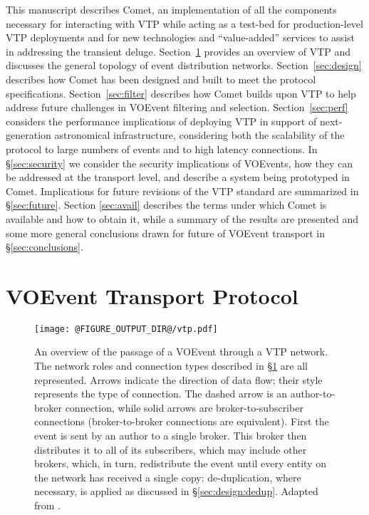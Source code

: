 \documentclass[5p,authoryear]{elsarticle}
\begin{document}
This manuscript describes Comet, an implementation of all the components
necessary for interacting with VTP while acting as a test-bed for
production-level VTP deployments and for new technologies and ``value-added''
services to assist in addressing the transient deluge. Section~\ref{sec:vtp}
provides an overview of VTP and discusses the general topology of event
distribution networks. Section~\ref{sec:design} describes how Comet has been
designed and built to meet the protocol specifications.
Section~\ref{sec:filter} describes how Comet builds upon VTP to help address
future challenges in VOEvent filtering and selection. Section~\ref{sec:perf}
considers the performance implications of deploying VTP in support of
next-generation astronomical infrastructure, considering both the scalability
of the protocol to large numbers of events and to high latency connections. In
\S\ref{sec:security} we consider the security implications of VOEvents, how
they can be addressed at the transport level, and describe a system being
prototyped in Comet.  Implications for future revisions of the VTP standard
are summarized in \S\ref{sec:future}. Section \ref{sec:avail} describes the
terms under which Comet is available and how to obtain it, while a summary of
the results are presented and some more general conclusions drawn for future
of VOEvent transport in \S\ref{sec:conclusions}.

\section{VOEvent Transport Protocol}
\label{sec:vtp}

\begin{figure}
  \begin{center}
  \texttt{[image: @FIGURE\_OUTPUT\_DIR@/vtp.pdf]}
  \end{center}

  \caption{An overview of the passage of a VOEvent through a VTP network. The
  network roles and connection types described in \S\ref{sec:vtp} are all
  represented. Arrows indicate the direction of data flow; their style
  represents the type of connection. The dashed arrow is an author-to-broker
  connection, while solid arrows are broker-to-subscriber connections
  (broker-to-broker connections are equivalent). First the event is sent by an
  author to a single broker. This broker then distributes it to all of its
  subscribers, which may include other brokers, which, in turn, redistribute
  the event until every entity on the network has received a single copy:
  de-duplication, where necessary, is applied as discussed in
  \S\ref{sec:design:dedup}. Adapted from \citet{Swinbank:2014}.}

  \label{fig:vtp}
\end{figure}
\end{document}
